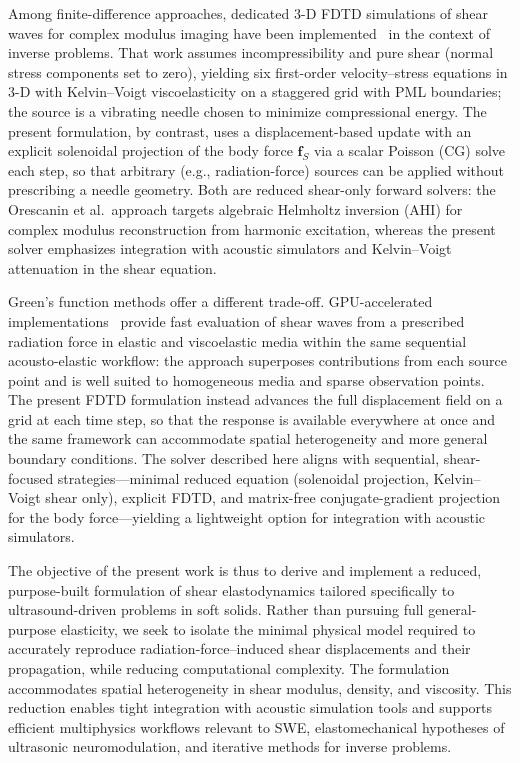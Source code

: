 \documentclass[11pt]{article}
\begin{document}
Among finite-difference approaches, dedicated 3-D FDTD simulations of shear
waves for complex modulus imaging have been implemented~\cite{orescanin2011fdtd}
in the context of inverse problems. That work assumes incompressibility and
pure shear (normal stress components set to zero), yielding six first-order
velocity--stress equations in 3-D with Kelvin--Voigt viscoelasticity on a
staggered grid with PML boundaries; the source is a vibrating needle chosen
to minimize compressional energy. The present formulation, by contrast, uses a
displacement-based update with an explicit solenoidal projection of the body
force $\mathbf{f}_S$ via a scalar Poisson (CG) solve each step, so that
arbitrary (e.g., radiation-force) sources can be applied without prescribing a
needle geometry. Both are reduced shear-only forward solvers: the Orescanin
et al.\ approach targets algebraic Helmholtz inversion (AHI) for complex
modulus reconstruction from harmonic excitation, whereas the present solver
emphasizes integration with acoustic simulators and Kelvin--Voigt
attenuation in the shear equation.

Green's function methods offer a different trade-off. GPU-accelerated
implementations~\cite{yang2018gpu} provide fast evaluation of shear waves from
a prescribed radiation force in elastic and viscoelastic media within the same
sequential acousto-elastic workflow: the approach superposes contributions from
each source point and is well suited to homogeneous media and sparse
observation points. The present FDTD formulation instead advances the full
displacement field on a grid at each time step, so that the response is
available everywhere at once and the same framework can accommodate spatial
heterogeneity and more general boundary conditions. The solver
described here aligns with sequential, shear-focused strategies—minimal
reduced equation (solenoidal projection, Kelvin--Voigt shear only), explicit
FDTD, and matrix-free conjugate-gradient projection for the body force—yielding
a lightweight option for integration with acoustic simulators.

The objective of the present work is thus to derive and implement a reduced,
purpose-built formulation of shear elastodynamics tailored specifically to
ultrasound-driven problems in soft solids. Rather than pursuing full
general-purpose elasticity, we seek to isolate the minimal physical model
required to accurately reproduce radiation-force–induced shear displacements and
their propagation, while reducing computational complexity. The formulation
accommodates spatial heterogeneity in shear modulus, density, and viscosity. This
reduction enables tight integration with acoustic simulation tools and supports
efficient multiphysics workflows relevant to SWE, elastomechanical hypotheses
of ultrasonic neuromodulation, and iterative methods for inverse problems.
\end{document}
